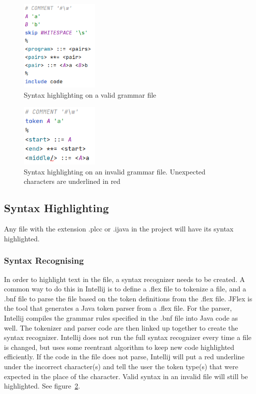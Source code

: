 \documentclass[conference, letterpaper]{IEEEtran}
\begin{document}
\begin{figure}[!t]
    \centering
    \includegraphics[width=1.5in]{syntax.png}
    \caption{Syntax highlighting on a valid grammar file}
    \label{fig:syntax}
\end{figure}
\begin{figure}[!t]
    \centering
    \includegraphics[width=1.5in]{syntax_invalid.png}
    \caption{Syntax highlighting on an invalid grammar file. Unexpected characters are underlined in red}
    \label{fig:syntax_invalid}
\end{figure}

\subsection{Syntax Highlighting}\label{subsec:new-.plcc-file-syntax-highlighting}
Any file with the extension .plcc or .ijava in the project will have its syntax highlighted.

\subsubsection{Syntax Recognising}\label{subsubsec:syntax-recognising}
In order to highlight text in the file, a syntax recognizer needs to be created.
A common way to do this in Intellij is to define a .flex file to tokenize a file, and a .bnf file to parse the file based on the token definitions from the .flex file.
JFlex is the tool that generates a Java token parser from a .flex file.
For the parser, Intellij compiles the grammar rules specified in the .bnf file into Java code as well.
The tokenizer and parser code are then linked up together to create the syntax recognizer.
Intellij does not run the full syntax recognizer every time a file is changed, but uses some reentrant algorithm to keep new code highlighted efficiently.
If the code in the file does not parse, Intellij will put a red underline under the incorrect character(s) and tell the user the token type(s) that were expected in the place of the character.
Valid syntax in an invalid file will still be highlighted.
See figure~\ref{fig:syntax_invalid}.
\end{document}
